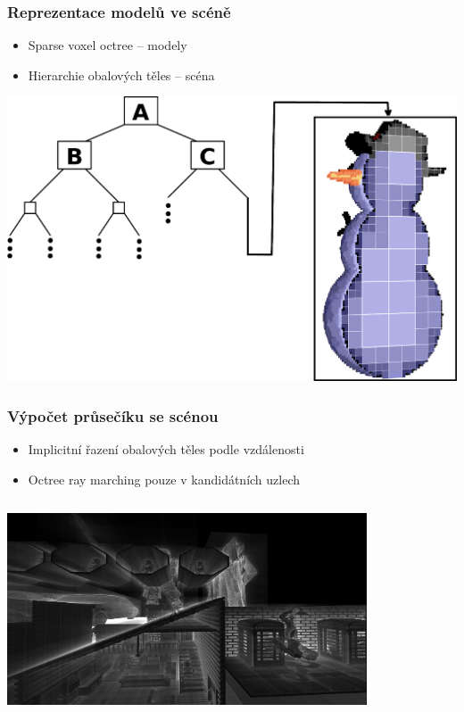 \documentclass[10pt,xcolor=pdflatex,hyperref={unicode},aspectratio=169]{beamer}
\begin{document}
\begin{frame}\frametitle{Reprezentace modelů ve scéně}
    \begin{itemize}
        \item Sparse voxel octree -- modely
        \item Hierarchie obalových těles -- scéna
    \end{itemize}
    \begin{center}
        \includegraphics[scale=0.8]{img/scene_structure.png}%
    \end{center}
\end{frame}

\begin{frame}\frametitle{Výpočet průsečíku se scénou}
    \begin{itemize}
        \item Implicitní řazení obalových těles podle vzdálenosti
        \item Octree ray marching pouze v kandidátních uzlech
    \end{itemize}
    \begin{column}{\textwidth}
        \begin{center}
            \includegraphics[width=0.8\textwidth]{img/bvh_iter.png}
        \end{center}
    \end{column}
\end{frame}
\end{document}
